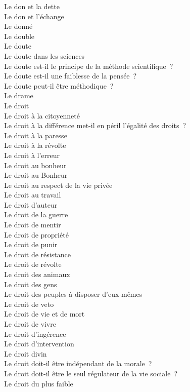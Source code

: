 \documentclass[a4paper,12pt]{article}
\begin{document}
Le don et la dette \\
Le don et l'échange \\
Le donné \\
Le double \\
Le doute \\
Le doute dans les sciences \\
Le doute est-il le principe de la méthode scientifique ? \\
Le doute est-il une faiblesse de la pensée ? \\
Le doute peut-il être méthodique ? \\
Le drame \\
Le droit \\
Le droit à la citoyenneté \\
Le droit à la différence met-il en péril l'égalité des droits ? \\
Le droit à la paresse \\
Le droit à la révolte \\
Le droit à l'erreur \\
Le droit au bonheur \\
Le droit au Bonheur \\
Le droit au respect de la vie privée \\
Le droit au travail \\
Le droit d'auteur \\
Le droit de la guerre \\
Le droit de mentir \\
Le droit de propriété \\
Le droit de punir \\
Le droit de résistance \\
Le droit de révolte \\
Le droit des animaux \\
Le droit des gens \\
Le droit des peuples à disposer d'eux-mêmes \\
Le droit de veto \\
Le droit de vie et de mort \\
Le droit de vivre \\
Le droit d'ingérence \\
Le droit d'intervention \\
Le droit divin \\
Le droit doit-il être indépendant de la morale ? \\
Le droit doit-il être le seul régulateur de la vie sociale ? \\
Le droit du plus faible \\
\end{document}
